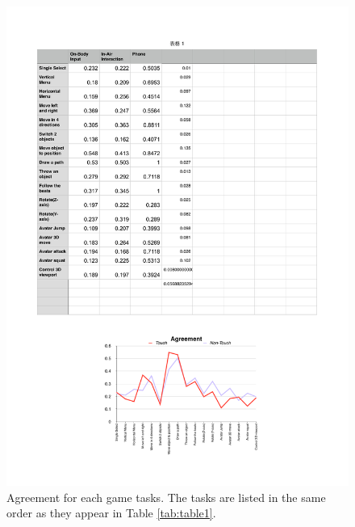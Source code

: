 \documentclass{sigchi}
\begin{document}
 \begin{figure}[!h]
  \centering
  \includegraphics[width=1\columnwidth]{Agreement}

  \caption{Agreement for each game tasks. The tasks are listed in the same order as they appear in Table \ref{tab:table1}.}
  \label{fig:Agreement}
  \end{figure} 


\end{document}
